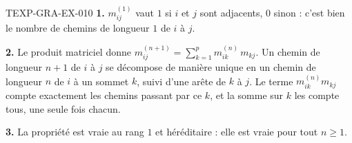 % 
% 
\begin{corrige}{TEXP-GRA-EX-010}
\textbf{1.} $m^{(1)}_{ij}$ vaut $1$ si $i$ et $j$ sont adjacents, $0$ sinon :
c'est bien le nombre de chemins de longueur $1$ de $i$ à $j$.

\textbf{2.} Le produit matriciel donne
$m^{(n+1)}_{ij}=\sum_{k=1}^{p}m^{(n)}_{ik}\,m_{kj}$. Un chemin de longueur
$n+1$ de $i$ à $j$ se décompose de manière unique en un chemin de longueur $n$
de $i$ à un sommet $k$, suivi d'une arête de $k$ à $j$. Le terme
$m^{(n)}_{ik}m_{kj}$ compte exactement les chemins passant par ce $k$, et la
somme sur $k$ les compte tous, une seule fois chacun.

\textbf{3.} La propriété est vraie au rang $1$ et héréditaire : elle est vraie
pour tout $n\geq1$.
\end{corrige}
